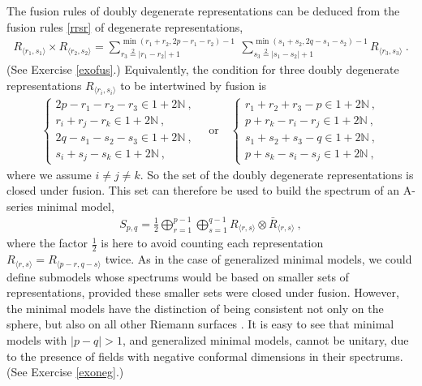 \documentclass[12pt, a4paper, notitlepage, twoside]{report}
\numberwithin{equation}{section}
\theoremstyle{break}
\begin{document}
The fusion rules of doubly degenerate representations can be deduced from the fusion rules \eqref{rrsr} of degenerate representations, 
\begin{align}
  \boxed{R_{\langle r_1,s_1 \rangle} \times R_{\langle r_2,s_2 \rangle} = \sum_{r_3\overset{2}{=}|r_1-r_2|+1}^{\min(r_1+r_2,2p-r_1-r_2)-1}\ \sum_{s_3\overset{2}{=}|s_1-s_2|+1}^{\min(s_1+s_2,2q-s_1-s_2)-1} R_{\langle r_3,s_3 \rangle}}\ .
\label{rrmm}
\end{align}
(See Exercise \ref{exofus}.) Equivalently, 
the condition for three doubly degenerate representations $R_{\langle r_i,s_i \rangle}$ to be intertwined by fusion is 
\begin{align}
 \left\{\begin{array}{l}  2p-r_1-r_2-r_3\in 1+2{\mathbb{N}}\ , \\
 r_i+r_j-r_k \in 1 + 2{\mathbb{N}}\ , \\
2q-s_1-s_2-s_3\in 1+2{\mathbb{N}}\ , \\
 s_i+s_j-s_k \in 1 + 2{\mathbb{N}}\ , \end{array}\right.  
\quad \text{or} \quad
 \left\{\begin{array}{l}  r_1+r_2+r_3-p\in 1+2{\mathbb{N}}\ , \\
 p+r_k-r_i-r_j\in 1+2{\mathbb{N}} \ , \\
s_1+s_2+s_3-q\in 1+2{\mathbb{N}}\ , \\
 p+s_k-s_i-s_j\in 1+2{\mathbb{N}} \ ,\end{array}\right. 
\end{align}
where we assume $i\neq j\neq k$.
So the set of the doubly degenerate representations is closed under fusion.
This set can therefore be used to build the spectrum of an A-series minimal model,
\begin{align}
 \boxed{ S_{p,q} = \frac12 \bigoplus_{r=1}^{p-1} \bigoplus_{s=1}^{q-1} R_{\langle r,s \rangle}\otimes \bar{R}_{\langle r,s \rangle} } \ ,
\label{smin}
\end{align}
where the factor $\frac12$ is here to avoid counting each representation $R_{\langle r,s \rangle}=R_{\langle p-r,q-s \rangle}$ twice.
As in the case of generalized minimal models, we could define submodels whose spectrums would be based on smaller sets of representations, provided these smaller sets were closed under fusion.
However, the minimal models have the distinction of being consistent not only on the sphere, but also on all other Riemann surfaces \cite{fms97}.
It is easy to see that minimal models with $|p-q|>1$, and generalized minimal models, cannot be unitary, due to the presence of fields with negative conformal dimensions in their spectrums. (See Exercise \ref{exoneg}.)
\end{document}
